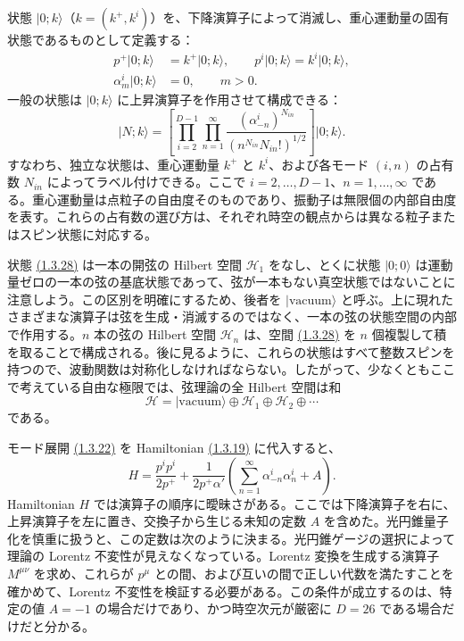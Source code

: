 状態 $\lvert0;k\rangle$（$k=(k^+,k^i)$）を、下降演算子によって消滅し、重心運動量の固有状態であるものとして定義する：
\begin{align}
p^+\lvert0;k\rangle&=k^+\lvert0;k\rangle,\qquad
p^i\lvert0;k\rangle=k^i\lvert0;k\rangle,
\tag{1.3.27a}\label{eq:1.3.27a}\\
\alpha_m^i\lvert0;k\rangle&=0,\qquad m>0.
\tag{1.3.27b}\label{eq:1.3.27b}
\end{align}
一般の状態は $\lvert0;k\rangle$ に上昇演算子を作用させて構成できる：
\begin{equation}
\lvert N;k\rangle=
\left[\prod_{i=2}^{D-1}\prod_{n=1}^\infty
\frac{(\alpha_{-n}^i)^{N_{in}}}
{(n^{N_{in}}N_{in}!)^{1/2}}\right]\lvert0;k\rangle.
\tag{1.3.28}\label{eq:1.3.28}
\end{equation}
すなわち、独立な状態は、重心運動量 $k^+$ と $k^i$、および各モード $(i,n)$ の占有数 $N_{in}$ によってラベル付けできる。ここで $i=2,\ldots,D-1$、$n=1,\ldots,\infty$ である。重心運動量は点粒子の自由度そのものであり、振動子は無限個の内部自由度を表す。これらの占有数の選び方は、それぞれ時空の観点からは異なる粒子またはスピン状態に対応する。

状態 \hyperref[eq:1.3.28]{(1.3.28)} は一本の開弦の Hilbert 空間 $\mathcal H_1$ をなし、とくに状態 $\lvert0;0\rangle$ は運動量ゼロの一本の弦の基底状態であって、弦が一本もない真空状態ではないことに注意しよう。この区別を明確にするため、後者を $\lvert\mathrm{vacuum}\rangle$ と呼ぶ。上に現れたさまざまな演算子は弦を生成・消滅するのではなく、一本の弦の状態空間の内部で作用する。$n$ 本の弦の Hilbert 空間 $\mathcal H_n$ は、空間 \hyperref[eq:1.3.28]{(1.3.28)} を $n$ 個複製して積を取ることで構成される。後に見るように、これらの状態はすべて整数スピンを持つので、波動関数は対称化しなければならない。したがって、少なくともここで考えている自由な極限では、弦理論の全 Hilbert 空間は和
\begin{equation}
\mathcal H=\lvert\mathrm{vacuum}\rangle\oplus\mathcal H_1\oplus
\mathcal H_2\oplus\cdots
\tag{1.3.29}\label{eq:1.3.29}
\end{equation}
である。

モード展開 \hyperref[eq:1.3.22]{(1.3.22)} を Hamiltonian \hyperref[eq:1.3.19]{(1.3.19)} に代入すると、
\begin{equation}
H=\frac{p^ip^i}{2p^+}+
\frac{1}{2p^+\alpha'}\left(\sum_{n=1}^\infty\alpha_{-n}^i\alpha_n^i+A\right).
\tag{1.3.30}\label{eq:1.3.30}
\end{equation}
Hamiltonian $H$ では演算子の順序に曖昧さがある。ここでは下降演算子を右に、上昇演算子を左に置き、交換子から生じる未知の定数 $A$ を含めた。光円錐量子化を慎重に扱うと、この定数は次のように決まる。光円錐ゲージの選択によって理論の Lorentz 不変性が見えなくなっている。Lorentz 変換を生成する演算子 $M^{\mu\nu}$ を求め、これらが $p^\mu$ との間、および互いの間で正しい代数を満たすことを確かめて、Lorentz 不変性を検証する必要がある。この条件が成立するのは、特定の値 $A=-1$ の場合だけであり、かつ時空次元が厳密に $D=26$ である場合だけだと分かる。

